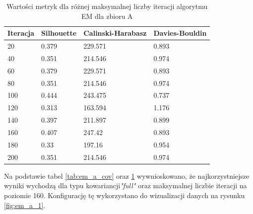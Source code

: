 \documentclass[a4paper,11pt]{article}
\begin{document}
\begin{table}[H]
    \centering
    \begin{tabular}{|l|l|l|l|}
    \hline
    \textbf{Iteracja} & \textbf{Silhouette} & \textbf{Calinski-Harabasz} & \textbf{Davies-Bouldin} \\ \hline
    20                & 0.379               & 229.571                    & 0.893                   \\ \hline
    40                & 0.351               & 214.546                    & 0.974                   \\ \hline
    60                & 0.379               & 229.571                    & 0.893                   \\ \hline
    80                & 0.351               & 214.546                    & 0.974                   \\ \hline
    100               & 0.444               & 243.475                    & 0.737                   \\ \hline
    120               & 0.313               & 163.594                    & 1.176                   \\ \hline
    140               & 0.397               & 211.897                    & 0.899                   \\ \hline
    160               & 0.407               & 247.42                     & 0.893                   \\ \hline
    180               & 0.33                & 197.16                     & 0.954                   \\ \hline
    200               & 0.351               & 214.546                    & 0.974                   \\ \hline
    \end{tabular}
    \caption{Wartości metryk dla różnej maksymalnej liczby iteracji algorytmu EM dla zbioru A}
    \label{tab:em_a_iter}
\end{table}

Na podstawie tabel \ref{tab:em_a_cov} oraz \ref{tab:em_a_iter} wywnioskowano, że najkorzystniejsze wyniki wychodzą dla typu kowariancji\textit{"full"} oraz maksymalnej liczbie iteracji na poziomie 160. Konfigurację tę wykorzystano do wizualizacji danych na rysunku \ref{fig:em_a_1}.
\end{document}
